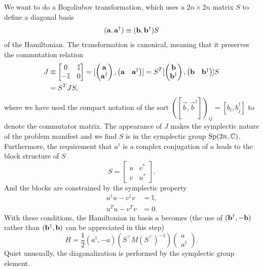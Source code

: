 We want to do a Bogoliubov transformation, which uses a $2n \times 2n$ matrix $S$ to define a diagonal basis 
\begin{equation}\begin{aligned}
\label{eq:def_a}
({\bf a} , {\bf a}^\dagger)\equiv({\bf b} , {\bf b}^\dagger)S
\end{aligned}\end{equation}
of the Hamiltonian. The transformation is canonical, meaning that it preserves the commutation relation 
\begin{equation}
\begin{aligned}
\label{eq:preserve_commutator}
J&\equiv\begin{bmatrix}
0 & \mathbb{I}\\
-\mathbb{I} & 0
\end{bmatrix}
=[
\begin{pmatrix}
{\bf a} \\
{\bf a}^\dagger
\end{pmatrix},
\begin{pmatrix}
{\bf a} & {\bf a}^\dagger
\end{pmatrix}]
=S^T[
\begin{pmatrix}
{\bf b} \\
{\bf b}^\dagger
\end{pmatrix},
\begin{pmatrix}
{\bf b} & {\bf b}^\dagger
\end{pmatrix}]S \\
&=S^T JS,
\end{aligned}
\end{equation}
where we have used the compact notation of the sort $([\vec{b}, \vec{b}^{\dagger}])_{ij} =  [b_i, b_j^\dagger]$ to denote the commutator matrix. The appearance of $J$ makes the symplectic nature of the problem manifest and we find $S$ is in the symplectic group ${\rm Sp}( 2n, \mathbb{C} ) $\cite{blaizot_quantum_1986,fulton_representation_2004}. Furthermore, the requirement that $a^\dagger$ is a complex conjugation of $a$ leads to the block structure of $S$
\begin{equation}
\label{eq:block_S}
S=
\begin{bmatrix}
u & v^*\\
v & u^*
\end{bmatrix}.
\end{equation}
And the blocks are constrained by the symplectic property
\begin{eqnarray}
  u^\dagger u-v^\dagger v&=\mathbb{I},\label{eq:constraint_1}\\
  u^T u-v^T v&=0\label{eq:constraint_2}.  
\end{eqnarray}
With these conditions, the Hamiltonian in basis $a$ becomes (the use of $({\bf b}^\dagger , -{\bf b})$ rather than $({\bf b}^\dagger , {\bf b})$ can be appreciated in this step)
\begin{equation}
H = \frac{1}{2} ( a^{\dagger}, -a )  (S^{\top} M (S^{\top})^{-1} )
\begin{pmatrix}
a\\
a^{\dagger} 
\end{pmatrix}.
\end{equation}
Quiet unusually, the diagonalization is performed by the symplectic group element.

